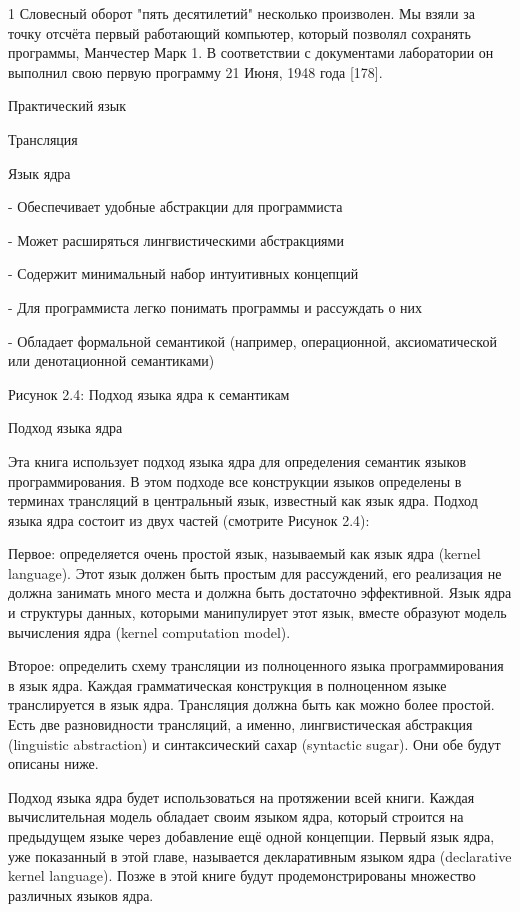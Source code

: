 1 Словесный оборот "пять десятилетий" несколько произволен. Мы взяли за точку отсчёта первый работающий компьютер, который позволял сохранять программы, Манчестер Марк 1. В соответствии с документами лаборатории он выполнил свою первую программу 21 Июня, 1948 года [178].

Практический язык

Трансляция

Язык ядра

- Обеспечивает удобные абстракции для программиста

- Может расширяться лингвистическими абстракциями

- Содержит минимальный набор интуитивных концепций

- Для программиста легко понимать программы и рассуждать о них

- Обладает формальной семантикой (например, операционной, аксиоматической или денотационной семантиками)

Рисунок 2.4: Подход языка ядра к семантикам

Подход языка ядра

Эта книга использует подход языка ядра для определения семантик языков программирования. В этом подходе все конструкции языков определены в терминах трансляций в центральный язык, известный как язык ядра. Подход языка ядра состоит из двух частей (смотрите Рисунок 2.4):

Первое: определяется очень простой язык, называемый как язык ядра (kernel language). Этот язык должен быть простым для рассуждений, его реализация не должна занимать много места и должна быть достаточно эффективной. Язык ядра и структуры данных, которыми манипулирует этот язык, вместе образуют модель вычисления ядра (kernel computation model).

Второе: определить схему трансляции из полноценного языка программирования в язык ядра. Каждая грамматическая конструкция в полноценном языке транслируется в язык ядра. Трансляция должна быть как можно более простой. Есть две разновидности трансляций, а именно, лингвистическая абстракция (linguistic abstraction) и синтаксический сахар (syntactic sugar). Они обе будут описаны ниже.

Подход языка ядра будет использоваться на протяжении всей книги. Каждая вычислительная модель обладает своим языком ядра, который строится на предыдущем языке через добавление ещё одной концепции. Первый язык ядра, уже показанный в этой главе, называется декларативным языком ядра (declarative kernel language). Позже в этой книге будут продемонстрированы множество различных языков ядра.

